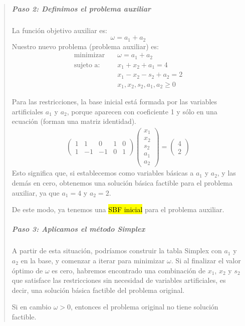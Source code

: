 \begin{quote}
  \subparagraph{Paso 2: Definimos el problema auxiliar}
  
  La función objetivo auxiliar es:
  \[
    \omega = a_1 + a_2
  \]
  Nuestro nuevo problema (problema auxiliar) es:
  \begin{align*}
    \text{minimizar} \quad  &\omega = a_1 + a_2\\[3pt]
    \text{sujeto a:} \quad  &x_1 + x_2 + a_1 = 4\\
                            &x_1 - x_2 - s_2 + a_2 = 2\\
                            &x_1, x_2, s_2, a_1, a_2 \geq 0
  \end{align*}

  Para las restricciones, la base inicial está formada por las variables artificiales \(a_1\) y \(a_2\), porque aparecen con coeficiente 1 y sólo en una ecuación (forman una matriz identidad).
  \begin{align*}
    \begin{pmatrix}
      1 & 1 & 0 & 1 & 0\\
      1 & -1 & -1 & 0 & 1
    \end{pmatrix}
    \begin{pmatrix}
      x_1\\
      x_2\\
      s_2\\
      a_1\\
      a_2
    \end{pmatrix}
    =
    \begin{pmatrix}
      4\\
      2
    \end{pmatrix}
  \end{align*}
  Esto significa que, si establecemos como variables básicas a \(a_1\) y \(a_2\), y las demás en cero, obtenemos una solución básica factible para el problema auxiliar, ya que \(a_1 = 4\) y \(a_2 = 2\).

  De este modo, ya tenemos una \hl{SBF inicial} para el problema auxiliar.
  
  \subparagraph{Paso 3: Aplicamos el método Simplex}
  
  A partir de esta situación, podríamos construir la tabla Simplex con \(a_1\) y \(a_2\) en la base, y comenzar a iterar para minimizar \(\omega\). Si al finalizar el valor óptimo de \(\omega\) es cero, habremos encontrado una combinación de \(x_1\), \(x_2\) y \(s_2\) que satisface las restricciones sin necesidad de variables artificiales, es decir, una solución básica factible del problema original.
  
  Si en cambio \(\omega > 0\), entonces el problema original no tiene solución factible.  
\end{quote}

